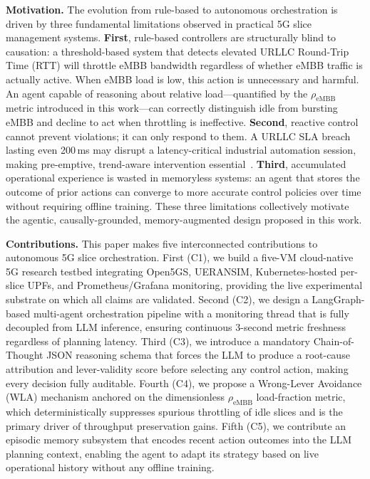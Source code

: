 \documentclass[12pt]{article}
\begin{document}
\medskip\noindent\textbf{Motivation.}\quad
The evolution from rule-based to autonomous orchestration is driven by
three fundamental limitations observed in practical 5G slice management
systems. \textbf{First}, rule-based controllers are structurally blind to
causation: a threshold-based system that detects elevated URLLC
Round-Trip Time (RTT) will throttle eMBB bandwidth regardless of whether
eMBB traffic is actually active. When eMBB load is low, this action is
unnecessary and harmful. An agent capable of reasoning about relative
load---quantified by the $\rho_\text{eMBB}$ metric introduced in this
work---can correctly distinguish idle from bursting eMBB and decline to
act when throttling is ineffective. \textbf{Second}, reactive control
cannot prevent violations; it can only respond to them. A URLLC SLA
breach lasting even 200\,ms may disrupt a latency-critical industrial
automation session, making pre-emptive, trend-aware intervention
essential~\cite{tran2025closed}. \textbf{Third}, accumulated operational
experience is wasted in memoryless systems: an agent that stores the
outcome of prior actions can converge to more accurate control policies
over time without requiring offline training. These three limitations
collectively motivate the agentic, causally-grounded, memory-augmented
design proposed in this work.

\medskip\noindent\textbf{Contributions.}\quad
This paper makes five interconnected contributions to autonomous 5G slice
orchestration. First (C1), we build a five-VM cloud-native 5G research
testbed integrating Open5GS, UERANSIM, Kubernetes-hosted per-slice UPFs,
and Prometheus\slash Grafana monitoring, providing the live experimental
substrate on which all claims are validated. Second (C2), we design a
LangGraph-based multi-agent orchestration pipeline with a monitoring
thread that is fully decoupled from LLM inference, ensuring continuous
3-second metric freshness regardless of planning latency. Third (C3), we
introduce a mandatory Chain-of-Thought JSON reasoning schema that forces
the LLM to produce a root-cause attribution and lever-validity score before
selecting any control action, making every decision fully auditable.
Fourth (C4), we propose a Wrong-Lever Avoidance (WLA) mechanism anchored
on the dimensionless $\rho_\text{eMBB}$ load-fraction metric, which
deterministically suppresses spurious throttling of idle slices and is the
primary driver of throughput preservation gains. Fifth (C5), we contribute
an episodic memory subsystem that encodes recent action outcomes into the
LLM planning context, enabling the agent to adapt its strategy based on
live operational history without any offline training.
\end{document}
